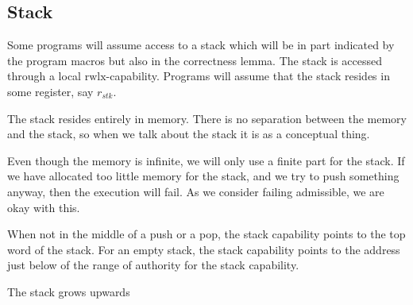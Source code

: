 \documentclass[a4paper]{article}
\newcommand{\var}[1]{\mathit{#1}}
\newcommand{\plainperm}[1]{\mathrm{#1}}
\newcommand{\rwlx}{\plainperm{rwlx}}
\begin{document}
\subsection{Stack}
Some programs will assume access to a stack which will be in part indicated by the program macros but also in the correctness lemma. The stack is accessed through a local $\rwlx$-capability. Programs will assume that the stack resides in some register, say $r_{\var{stk}}$.

The stack resides entirely in memory. There is no separation between the memory and the stack, so when we talk about the stack it is as a conceptual thing. %

Even though the memory is infinite, we will only use a finite part for the stack. If we have allocated too little memory for the stack, and we try to push something anyway, then the execution will fail. As we consider failing admissible, we are okay with this. 

When not in the middle of a push or a pop, the stack capability points to the top word of the stack. For an empty stack, the stack capability points to the address just below of the range of authority for the stack capability.

The stack grows upwards
\end{document}
